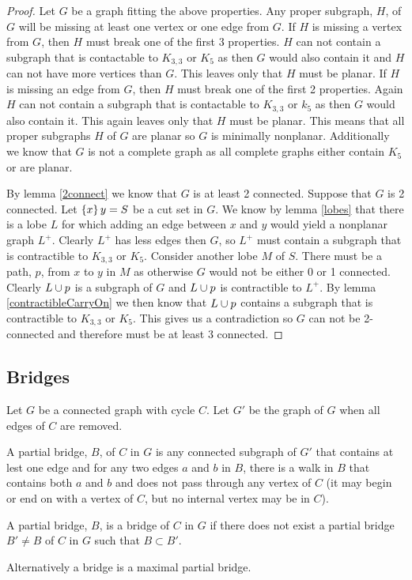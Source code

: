 \documentclass{article}
\begin{document}
\begin{proof}
	Let $G$ be a graph fitting the above properties. Any proper subgraph, $H$, of $G$ will be missing at least one vertex or one edge from $G$. If $H$ is missing a vertex from $G$, then $H$ must break one of the first 3 properties. $H$ can not contain a subgraph that is contactable to $K_{3,3}$ or $K_5$ as then $G$ would also contain it and $H$ can not have more vertices than $G$. This leaves only that $H$ must be planar. If $H$ is missing an edge from $G$, then $H$ must break one of the first 2 properties. Again $H$ can not contain a subgraph that is contactable to $K_{3,3}$ or $k_5$ as then $G$ would also contain it. This again leaves only that $H$ must be planar. This means that all proper subgraphs $H$ of $G$ are planar so $G$ is minimally nonplanar. Additionally we know that $G$ is not a complete graph as all complete graphs either contain $K_5$ or are planar.
	
	By lemma \ref{2connect} we know that $G$ is at least 2 connected. Suppose that $G$ is 2 connected. Let $\left\{ {x} \right\}y = S$ be a cut set in $G$. We know by lemma \ref{lobes} that there is a lobe $L$ for which adding an edge between $x$ and $y$ would yield a nonplanar graph $L^+$. Clearly $L^+$ has less edges then $G$, so $L^+$ must contain a subgraph that is contractible to $K_{3,3}$ or $K_{5}$. Consider another lobe $M$ of $S$. There must be a path, $p$, from $x$ to $y$ in $M$ as otherwise $G$ would not be either 0 or 1 connected. Clearly $L\cup p$ is a subgraph of $G$ and $L\cup p$ is contractible to $L^+$. By lemma \ref{contractibleCarryOn} we then know that $L\cup p$ contains a subgraph that is contractible to $K_{3,3}$ or $K_5$. This gives us a contradiction so $G$ can not be 2-connected and therefore must be at least 3 connected.
\end{proof}

\subsection{Bridges}

Let $G$ be a connected graph with cycle $C$. Let $G'$ be the graph of $G$ when all edges of $C$ are removed. 
\begin{definition}
	A partial bridge, $B$, of $C$ in $G$ is any connected subgraph of $G'$ that contains at lest one edge and for any two edges $a$ and $b$ in $B$, there is a walk in $B$ that contains both $a$ and $b$ and does not pass through any vertex of $C$ (it may begin or end on with a vertex of $C$, but no internal vertex may be in $C$). 
\end{definition}
\begin{definition}[bridge]
	A partial bridge, $B$, is a bridge of $C$ in $G$ if there does not exist a partial bridge $B'\not=B$ of $C$ in $G$ such that $B\subset B'$.
	
	Alternatively a bridge is a maximal partial bridge.
\end{definition}
\end{document}
